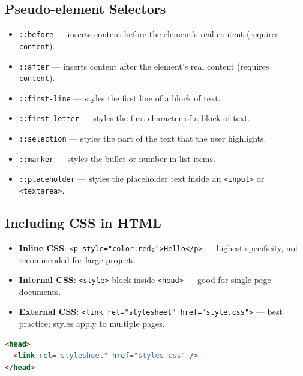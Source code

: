 \documentclass[hidelinks]{article}
\begin{document}
\subsection{Pseudo-element Selectors}
\begin{itemize}
  \item \texttt{::before} --- inserts content before the element’s real content (requires \texttt{content}).
  \item \texttt{::after} --- inserts content after the element’s real content (requires \texttt{content}).
  \item \texttt{::first-line} --- styles the first line of a block of text.
  \item \texttt{::first-letter} --- styles the first character of a block of text.
  \item \texttt{::selection} --- styles the part of the text that the user highlights.
  \item \texttt{::marker} --- styles the bullet or number in list items.
  \item \texttt{::placeholder} --- styles the placeholder text inside an \texttt{<input>} or \texttt{<textarea>}.
\end{itemize}

\subsection{Including CSS in HTML}
\begin{itemize}
  \item \textbf{Inline CSS}: \texttt{<p style="color:red;">Hello</p>} --- highest specificity, not recommended for large projects.
  \item \textbf{Internal CSS}: \texttt{<style>} block inside \texttt{<head>} --- good for single-page documents.
  \item \textbf{External CSS}: \texttt{<link rel="stylesheet" href="style.css">} --- best practice; styles apply to multiple pages.
\end{itemize}

\begin{lstlisting}[language=HTML, caption={Linking an external stylesheet}]
<head>
  <link rel="stylesheet" href="styles.css" />
</head>
\end{lstlisting}
\end{document}
